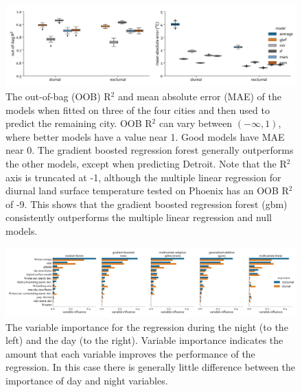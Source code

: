 \documentclass[final,3p,times,twocolumn,sort&compress]{elsarticle}
\begin{document}
\begin{figure}[h]
    \centering
    \includegraphics[width=\linewidth]{fig/report/holdout_results_100.pdf}
    \caption{
    The out-of-bag (OOB) R$^2$ and mean absolute error (MAE) of the models when fitted on three of the four cities and then used to predict the remaining city. OOB R$^2$ can vary between $(-\infty, 1)$, where better models have a value near 1. Good models have MAE near 0. The gradient boosted regression forest generally outperforms the other models, except when predicting Detroit. Note that the R$^2$ axis is truncated at -1, although the multiple linear regression for diurnal land surface temperature tested on Phoenix has an OOB R$^2$ of -9.  This shows that the gradient boosted regression forest (gbm) consistently outperforms the multiple linear regression and null models.
    }
    \label{fig:holdout_results}
\end{figure}



\begin{figure}[h]
\begin{center}
\includegraphics[width=\textwidth]{fig/report/variableImportance_100.pdf}
\caption{The variable importance for the regression during the night (to the left) and the day (to the right). Variable importance indicates the amount that each variable improves the performance of the regression.
In this case there is generally little difference between the importance of day and night variables.}
\label{fig:importance}
\end{center}
\end{figure}
\end{document}
